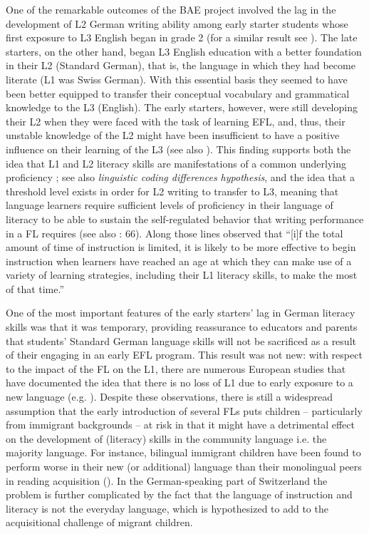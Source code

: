 \documentclass[output=paper,modfonts,nonflat,newtxmath]{langsci/langscibook}
\begin{document}
One of the remarkable outcomes of the BAE project involved the lag in the development of L2 German writing ability among early starter students whose first exposure to L3 English began in grade 2 (for a similar result see \citealt{Genesee2004}). The late starters, on the other hand, began L3 English education with a better foundation in their L2 (Standard German), that is, the language in which they had become literate (L1 was Swiss German). With this essential basis they seemed to have been better equipped to transfer their conceptual vocabulary and grammatical knowledge to the L3 (English). The early starters, however, were still developing their L2 when they were faced with the task of learning EFL, and, thus, their unstable knowledge of the L2 might have been insufficient to have a positive influence on their learning of the L3 (see also \citealt{Sánchez2012, Sánchez2015}). This finding supports both the idea that L1 and L2 literacy skills are manifestations of a common underlying proficiency \citep{Cummins1976, Cummins1981}; see also  \textit{linguistic coding differences hypothesis}, and the idea that  a threshold level exists in order for L2 writing to transfer to L3, meaning that language learners require sufficient levels of proficiency in their language of literacy to be able to sustain the self-regulated behavior that writing performance in a FL requires (see also \citealt{SchoonenEtAl2011}: 66). Along those lines \citet[449]{Lightbown2000} observed that “[i]f the total amount of time of instruction is limited, it is likely to be more effective to begin instruction when learners have reached an age at which they can make use of a variety of learning strategies, including their L1 literacy skills, to make the most of that time.”

One of the most important features of the early starters’ lag in German literacy skills was that it was temporary, providing reassurance to educators and parents that students’ Standard German language skills will not be sacrificed as a result of their engaging in an early EFL program. This result was not new: with respect to the impact of the FL on the L1, there are numerous European studies that have documented the idea that there is no loss of L1 due to early exposure to a new language (e.g. \citealt{Goorhuis-BrouwerDeBot2010}). Despite these observations, there is still a widespread assumption that the early introduction of several FLs puts children – particularly from immigrant backgrounds – at risk in that it might have a detrimental effect on the development of (literacy) skills in the community language i.e. the majority language. For instance, bilingual immigrant children have been found to perform worse in their new (or additional) language than their monolingual peers in reading acquisition (\citealt{AugustHakuta1997, SlavinCheung2003}). In the German-speaking part of Switzerland the problem is further complicated by the fact that the language of instruction and literacy is not the everyday language, which is hypothesized to add to the acquisitional challenge of migrant children.
\end{document}
